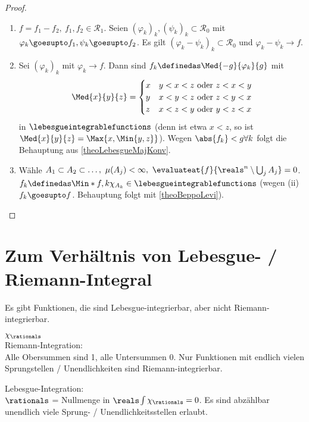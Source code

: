 \begin{proof}\ 
    
    \begin{enumerate}
        \item \(f=f_1-f_2,\ f_1,f_2\in\mathcal{R_1}\). Seien \((\varphi_k)_k,(\psi_k)_k\subset \mathcal{R_0}\) mit \(\varphi_k\goesupto f_1,\psi_k\goesupto f_2\).
        Es gilt \((\varphi_k-\psi_k)_k\subset\mathcal{R_0}\) und \(\varphi_k-\psi_k\to f\).
        
        \item Sei \((\varphi_k)_k\) mit \(\varphi_k\to f\). Dann sind \(f_k\definedas \Med{-g}{\varphi_k}{g}\) mit 
        \begin{equation*}
          \Med{x}{y}{z}=\begin{cases}
                x & y<x<z\text{ oder } z<x<y\\
                y & x<y<z\text{ oder } z<y<x\\
                z & x<z<y\text{ oder } y<z<x\\
            \end{cases}
        \end{equation*}
        in \(\lebesgueintegrablefunctions\) (denn ist etwa \(x<z\), so ist \(\Med{x}{y}{z}=\Max{x,\Min{y,z}}\)).
        Wegen \(\abs{f_k}<g\forall k\) folgt die Behauptung aus \ref{theoLebesgueMajKonv}.
        \item Wähle \(A_1\subset A_2\subset\ldots,\ \mu(A_j)<\infty,\ \evaluateat{f}{\reals^n\setminus \bigcup_j A_j}=0\).
        \(f_k\definedas \Min*{f,k\chi_{A_k}}\in \lebesgueintegrablefunctions\) (wegen (ii) \(f_k\goesupto f\). Behauptung folgt mit \ref{theoBeppoLevi}).
    \end{enumerate}
\end{proof}


\section*{Zum Verhältnis von Lebesgue- / Riemann-Integral}

Es gibt Funktionen, die sind Lebesgue-integrierbar, aber nicht Riemann-integrierbar.
\begin{beispiel}
    \(\chi_{\rationals}\)\\
    Riemann-Integration:\\
        Alle Obersummen sind 1, alle Untersummen 0. Nur Funktionen mit endlich vielen Sprungstellen / Unendlichkeiten sind Riemann-integrierbar.

    Lebesgue-Integration:\\
        \( \rationals \) = Nullmenge in \( \reals \)\timplies\(\int\chi_{\rationals}=0\). Es sind abzählbar unendlich viele Sprung- / Unendlichkeitsstellen erlaubt.
\end{beispiel}

